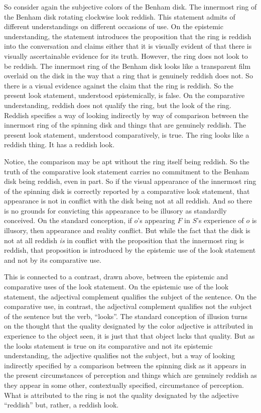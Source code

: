\documentclass[12pt]{article}
\begin{document}
So consider again the subjective colors of the Benham disk. The innermost ring of the Benham disk rotating clockwise look reddish. This statement admits of different understandings on different occasions of use. On the epistemic understanding, the statement introduces the proposition that the ring is reddish into the conversation and claims either that it is visually evident of that there is visually ascertainable evidence for its truth. However, the ring does not look to be reddish. The innermost ring of the Benham disk looks like a transparent film overlaid on the disk in the way that a ring that is genuinely reddish does not. So there is a visual evidence against the claim that the ring is reddish. So the present look statement, understood epistemically, is false. On the comparative understanding, reddish does not qualify the ring, but the look of the ring. Reddish specifies a way of looking indirectly by way of comparison between the innermost ring of the spinning disk and things that are genuinely reddish. The present look statement, understood comparatively, is true. The ring looks like a reddish thing. It has a reddish look.

Notice, the comparison may be apt without the ring itself being reddish. So the truth of the comparative look statement carries no commitment to the Benham disk being reddish, even in part. So if the visual appearance of the innermost ring of the spinning disk is correctly reported by a comparative look statement, that appearance is not in conflict with the disk being not at all reddish. And so there is no grounds for convicting this appearance to be illusory as standardly conceived. On the standard conception, if \( o \)'s appearing \( F \) in \( S \)'s experience of \( o \) is illusory, then appearance and reality conflict. But while the fact that the disk is not at all reddish \emph{is} in conflict with the proposition that the innermost ring is reddish, that proposition is introduced by the epistemic use of the look statement and not by its comparative use. 

This is connected to a contrast, drawn above, between the epistemic and comparative uses of the look statement. On the epistemic use of the look statement, the adjectival complement qualifies the subject of the sentence. On the comparative use, in contrast, the adjectival complement qualifies not the subject of the sentence but the verb, ``looks''. The standard conception of illusion turns on the thought that the quality designated by the color adjective is attributed in experience to the object seen, it is just that that object lacks that quality. But as the looks statement is true on its comparative and not its epistemic understanding, the adjective qualifies not the subject, but a way of looking indirectly specified by a comparison between the spinning disk as it appears in the present circumstances of perception and things which are genuinely reddish as they appear in some other, contextually specified, circumstance of perception. What is attributed to the ring is not the quality designated by the adjective ``reddish'' but, rather, a reddish look.
\end{document}
